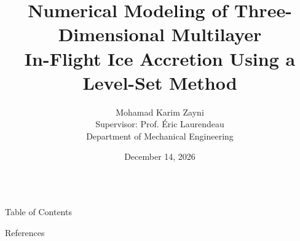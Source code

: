 \documentclass[10pt,aspectratio=169,xcolor={table,xcdraw}]{beamer}
\begin{document}
\title [Level Set Icing]{\Large Numerical Modeling of Three-Dimensional Multilayer\\ In-Flight Ice Accretion Using a Level-Set Method} 

\author[K. Zayni]{\large Mohamad Karim Zayni\\[0.15cm] \normalsize Supervisor: Prof. \'Eric Laurendeau\\ Department of Mechanical Engineering}


\date{\small December 14, 2026}

\begin{frame}[plain]
\vspace{-0.5cm}
\begin{columns}
\titlepage
{}
\end{columns}
\end{frame}

\begin{frame}{Table of Contents}
\Large
\tableofcontents
\end{frame}


%







\nocite{clift2005bubbles,OSHER2004,FROLKOVIC2015214,lavoieLevelSet,alessandroLevelSet,dapogny2014mmg}
\begin{frame}[allowframebreaks]{References}
\footnotesize

\end{frame}
\end{document}
